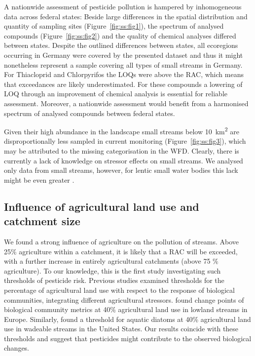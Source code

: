A nationwide assessment of pesticide pollution is hampered by inhomogeneous data across federal states:
Beside large differences in the spatial distribution and quantity of sampling sites (Figure~\ref{fig:ss:fig1}), the spectrum of analysed compounds (Figure~\ref{fig:ss:fig2}) and the quality of chemical analyses differed between states. 
Despite the outlined differences between states, all ecoregions occurring in Germany \citep{illies1978limnofauna,abell2008freshwater} were covered by the presented dataset and thus it might nonetheless represent a sample covering all types of small streams in Germany. 
For Thiacloprid and Chlorpyrifos the LOQs were above the RAC, which means that exceedances are likely underestimated.
For these compounds a lowering of LOQ through an improvement of chemical analysis is essential for reliable assessment.
Moreover, a nationwide assessment would benefit from a harmonised spectrum of analysed compounds between federal states. 

Given their high abundance in the landscape \citep{nadeau_hydrological_2007} small streams below 10~km\textsuperscript{2} are disproportionally less sampled in current monitoring (Figure~\ref{fig:ss:fig3}), which may be attributed to the missing categorisation in the WFD. 
Clearly, there is currently a lack of knowledge on stressor effects on small streams.
We analysed only data from small streams, however, for lentic small water bodies this lack might be even greater \citep{lorenz_specifics_2016}. 



\subsection{Influence of agricultural land use and catchment size}
We found a strong influence of agriculture on the pollution of streams.
Above 25\% agriculture within a catchment, it is likely that a RAC will be exceeded, with a further increase in entirely agricultural catchments (above 75 \% agriculture).
To our knowledge, this is the first study investigating such thresholds of pesticide risk.
Previous studies examined thresholds for the percentage of agricultural land use with respect to the response of biological communities, integrating different agricultural stressors.
\citet{feld_response_2013} found change points of biological community metrics at 40\% agricultural land use in lowland streams in Europe.
Similarly, \citet{waite_agricultural_2014} found a threshold for aquatic diatoms at 40\% agricultural land use in wadeable streams in the United States.
Our results coincide with these thresholds and suggest that pesticides might contribute to the observed biological changes. 

